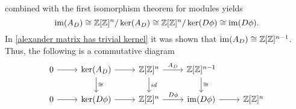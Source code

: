  combined with the first isomorphism theorem for modules yields
$$\operatorname{im}(A_D)\cong \operatorname{\mathbb{Z}}[\operatorname{\mathbb{Z}}]^n/\ker(A_D)\cong \operatorname{\mathbb{Z}}[\operatorname{\mathbb{Z}}]^n/\ker(D\phi)\cong \operatorname{im}(D\phi).$$
In \cref{alexander matrix has trivial kernel} it was shown that $\operatorname{im}(A_D)\cong \operatorname{\mathbb{Z}}[\operatorname{\mathbb{Z}}]^{n-1}$. Thus, the following is a commutative diagram
$$
\begin{tikzcd}
  0\arrow[r] & \ker(A_D)\arrow[r] \arrow[d, "\cong"] & \Z[\Z]^n\arrow[r, "A_D"] \arrow[d, "id"] & \Z[\Z]^{n-1}\arrow[d, "\cong"] \\ 
  0\arrow[r] & \ker(D\phi)\arrow[r] & \Z[\Z]^n\arrow[r, "D\phi"] & \im(D\phi) \arrow[r] & \Z[\Z]^n
\end{tikzcd}
$$
